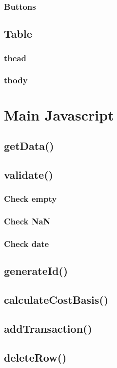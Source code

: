 \documentclass[letterpaper]{article}
\begin{document}
\subsubsection{Buttons}
\subsection{Table}
\subsubsection{thead}
\subsubsection{tbody}

\newpage

\section{Main Javascript}\label{JS}
\subsection{getData()}
\subsection{validate()}
\subsubsection{Check empty}
\subsubsection{Check NaN}
\subsubsection{Check date}
\subsection{generateId()}
\subsection{calculateCostBasis()}
\subsection{addTransaction()}
\subsection{deleteRow()}
\end{document}
